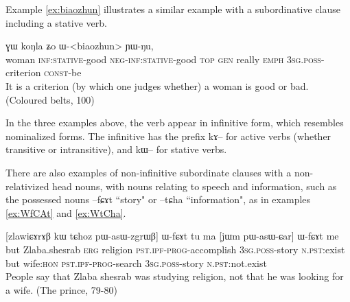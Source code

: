 \documentclass[oldfontcommands,oneside,a4paper,11pt]{article}
\newcommand{\ipa}[1]{{\phon #1}} %
\begin{document}
Example \ref{ex:biaozhun} illustrates a similar example with a subordinative clause including a stative verb.
\begin{exe}
   \ex  \label{ex:biaozhun}
\gll   
 	[\ipa{tɕheme}  	\ipa{kɯ-pe}  	\ipa{mɤ-kɯ-pe}]  	\ipa{nɯ}  	\ipa{ɣɯ}  	\ipa{koŋla}  	\ipa{ʑo}  	\ipa{ɯ}-<biaozhun>  	\ipa{ɲɯ-ŋu,}  \\
woman \textsc{inf:stative}-good \textsc{neg-inf:stative}-good \textsc{top} \textsc{gen} really \textsc{emph} \textsc{3sg.poss}-criterion \textsc{const}-be \\

\glt It is a criterion (by which one judges whether) a woman is good or bad. (Coloured belts, 100)
   \end{exe}



In the three examples above, the verb appear in infinitive form, which resembles nominalized forms. The infinitive has the prefix \ipa{kɤ}-- for active verbs (whether transitive or intransitive), and \ipa{kɯ}-- for stative verbs.





There are also examples of non-infinitive subordinate clauses with a non-relativized head nouns, with nouns relating to  speech and information, such as the possessed nouns \ipa{--fɕɤt} ``story" or \ipa{--tɕha} ``information", as in examples  \ref{ex:WfCAt} and \ref{ex:WtCha}.
\begin{exe}
   \ex  \label{ex:WfCAt}
\gll   \ipa{tɕeri}  	[\ipa{zlawiɕɤrɤβ}  	\ipa{kɯ}  	\ipa{tɕhoz}  	\ipa{pɯ-asɯ-zgrɯβ}]  	\ipa{ɯ-fɕɤt}  	\ipa{tu}  	\ipa{ma}  	[\ipa{jɯm}  	\ipa{pɯ-asɯ-ɕar}]  	\ipa{ɯ-fɕɤt}  	\ipa{me}  \\
but Zlaba.shesrab \textsc{erg} religion \textsc{pst.ipf-prog}-accomplish \textsc{3sg.poss}-story
\textsc{n.pst}:exist but wife:\textsc{hon} \textsc{pst.ipf-prog}-search \textsc{3sg.poss}-story \textsc{n.pst}:not.exist \\
\glt People say that Zlaba shesrab was studying religion, not that he was looking for a wife.  (The prince, 79-80)
\end{exe}
\end{document}
